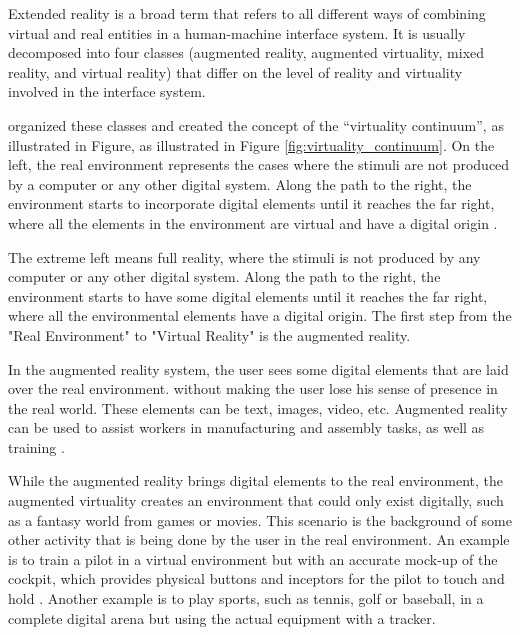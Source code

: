Extended reality is a broad term that refers to all different ways of combining virtual and real entities in a human-machine interface system. It is usually decomposed into four classes (augmented reality, augmented virtuality, mixed reality, and virtual reality) that differ on the level of reality and virtuality involved in the interface system. 

 organized these classes and created the concept of the “virtuality continuum”, as illustrated in Figure, as illustrated in Figure \ref{fig:virtuality_continuum}. On the left, the real environment represents the cases where the stimuli are not produced by a computer or any other digital system. Along the path to the right, the environment starts to incorporate digital elements until it reaches the far right, where all the elements in the environment are virtual and have a digital origin \cite{nijholt2005virtuality, doolani2020review}.



The extreme left means full reality, where the stimuli is not produced by any computer or any other digital system. Along the path to the right, the environment starts to have some digital elements until it reaches the far right, where all the environmental elements have a digital origin. The first step from the "Real Environment" to "Virtual Reality" is the augmented reality.

In the augmented reality system, the user sees some digital elements that are laid over the real environment. without making the user lose his sense of presence in the real world. These elements can be text, images, video, etc. Augmented reality can be used to assist workers in manufacturing and assembly tasks, as well as training \cite{doolani2020review, farrell2018learning, ma2007virtuality}.
    
While the augmented reality brings digital elements to the real environment, the augmented virtuality creates an environment that could only exist digitally, such as a fantasy world from games or movies. This scenario is the background of some other activity that is being done by the user in the real environment. An example is to train a pilot in a virtual environment but with an accurate mock-up of the cockpit, which provides physical buttons and inceptors for the pilot to touch and hold \cite{farshid2018go}. Another example is to play sports, such as tennis, golf or baseball, in a complete digital arena but using the actual equipment with a tracker.

